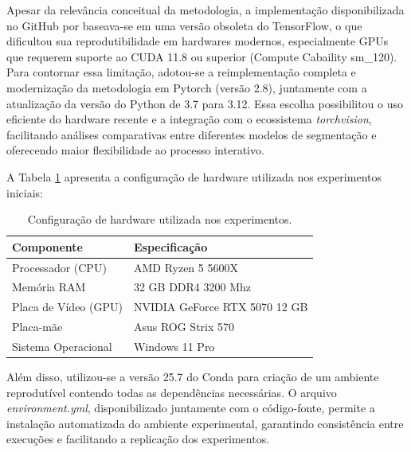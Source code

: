 Apesar da relevância conceitual da metodologia, a implementação disponibilizada no GitHub por  baseava-se em uma versão obsoleta do TensorFlow, o que dificultou sua reprodutibilidade em hardwares modernos, especialmente GPUs que requerem suporte ao CUDA 11.8 ou superior (Compute Cabaility sm\_120). Para contornar essa limitação, adotou-se a reimplementação completa e modernização da metodologia em Pytorch (versão 2.8), juntamente com a atualização da versão do Python de 3.7 para 3.12. Essa escolha possibilitou o uso eficiente do hardware recente e a integração com o ecossistema \textit{torchvision}, facilitando análises comparativas entre diferentes modelos de segmentação e oferecendo maior flexibilidade ao processo interativo. %

A Tabela \ref{tab:hardware} apresenta a configuração de hardware utilizada nos experimentos iniciais:


\begin{table}[h!]
\centering
\caption{Configuração de hardware utilizada nos experimentos.}
\label{tab:hardware}
\begin{tabular}{|l|l|}
\hline
\textbf{Componente} & \textbf{Especificação} \\
\hline
Processador (CPU) & AMD Ryzen 5 5600X \\
Memória RAM & 32 GB DDR4 3200 Mhz \\
Placa de Vídeo (GPU) & NVIDIA GeForce RTX 5070 12 GB \\
Placa-mãe & Asus ROG Strix 570 \\
Sistema Operacional & Windows 11 Pro \\
\hline
\end{tabular}
\end{table}

Além disso, utilizou-se a versão 25.7 do Conda para criação de um ambiente reprodutível contendo todas as dependências necessárias. O arquivo \textit{environment.yml}, disponibilizado juntamente com o código-fonte, permite a instalação automatizada do ambiente experimental, garantindo consistência entre execuções e facilitando a replicação dos experimentos. %

